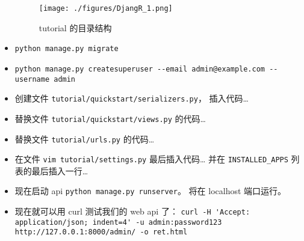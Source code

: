 \begin{itemize}
\begin{figure}[ht]
\centering
\texttt{[image: ./figures/DjangR\_1.png]}
\caption{tutorial 的目录结构} \label{DjangR_fig1}
\end{figure}
\item \verb|python manage.py migrate|
\item \verb|python manage.py createsuperuser --email admin@example.com --username admin|
\item 创建文件 \verb|tutorial/quickstart/serializers.py|， 插入代码…
\item 替换文件 \verb|tutorial/quickstart/views.py| 的代码…
\item 替换文件 \verb|tutorial/urls.py| 的代码…
\item 在文件 \verb|vim tutorial/settings.py| 最后插入代码… 并在 \verb|INSTALLED_APPS| 列表的最后插入一行…
\item 现在启动 api \verb|python manage.py runserver|。 将在 localhost 端口运行。
\item 现在就可以用 curl 测试我们的 web api 了： \verb|curl -H 'Accept: application/json; indent=4' -u admin:password123 http://127.0.0.1:8000/admin/ -o ret.html|
\end{itemize}
